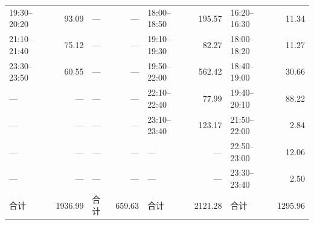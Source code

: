 \begin{table}[htbp]
\begin{tabular}{lrlrlrlr}
19:30--20:20 & 93.09 & — & — & 18:00--18:50 & 195.57 & 16:20--16:30 & 11.34\\
21:10--21:40 & 75.12 & — & — & 19:10--19:30 & 82.27 & 18:00--18:20 & 11.27\\
23:30--23:50 & 60.55 & — & — & 19:50--22:00 & 562.42 & 18:40--19:00 & 30.66\\
— & — & — & — & 22:10--22:40 & 77.99 & 19:40--20:10 & 88.22\\
— & — & — & — & 23:10--23:40 & 123.17 & 21:50--22:00 & 2.84\\
— & — & — & — & — & — & 22:50--23:00 & 12.06\\
— & — & — & — & — & — & 23:30--23:40 & 2.50\\
合计 & 1936.99 & 合计 & 659.63 & 合计 & 2121.28 & 合计 & 1295.96\\
\bottomrule\end{tabular}\end{table}

\FloatBarrier
